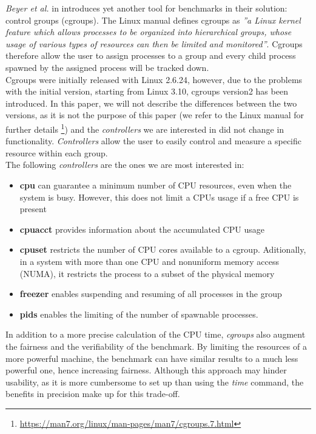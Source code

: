 \textit{Beyer et al.} in \cite{Beyer2017ReliableBR} introduces yet another tool for benchmarks in their solution: control groups (cgroups). The Linux manual defines cgroups as \textit{''a Linux kernel feature which allows processes to be organized into hierarchical groups, whose usage of various types of resources can then be limited and monitored''}. \cite{LinuxManualWeb} Cgroups therefore allow the user to assign processes to a group and every child process spawned by the assigned process will be tracked down. \\
Cgroups were initially released with Linux 2.6.24, however, due to the problems with the initial version, starting from Linux 3.10, cgroups version2 has been introduced. In this paper, we will not describe the differences between the two versions, as it is not the purpose of this paper (we refer to the Linux manual for further details \footnote{ \url{https://man7.org/linux/man-pages/man7/cgroups.7.html}}) and the \textit{controllers} we are interested in did not change in functionality.  \textit{Controllers} allow the user to easily control and measure a specific resource within each group. \cite{Beyer2017ReliableBR}\\
The following \textit{controllers} are the ones we are most interested in:
\begin{itemize}
    \item[] \textbf{cpu} \quad    can guarantee a minimum number of CPU resources, even when the system is busy. However, this does not limit a CPUs usage if a free CPU is present
    \item[] \textbf{cpuacct} \quad provides information about the accumulated CPU usage
    \item[] \textbf{cpuset} \quad restricts the number of CPU cores available to a cgroup. Aditionally, in a system with more than one CPU and nonuniform memory access (NUMA), it restricts the process to a subset of the physical memory  \cite{Beyer2017ReliableBR}
    \item[] \textbf{freezer} \quad enables suspending and resuming of all processes in the group
    \item[] \textbf{pids} \quad enables the limiting of the number of spawnable processes. 
\end{itemize}
In addition to a more precise calculation of the CPU time, \textit{cgroups} also augment the fairness and the verifiability of the benchmark. By limiting the resources of a more powerful machine, the benchmark can have similar results to a much less powerful one, hence increasing fairness. 
Although this approach may hinder usability, as it is more cumbersome to set up than using the \textit{time} command, the benefits in precision make up for this trade-off. 

